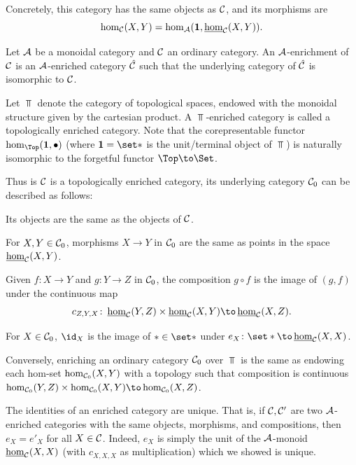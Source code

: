     Concretely, this category has the same objects as ${{\cal C}}$, and its morphisms are
    $$ \hom_{{\cal C}}(X,Y) = \hom_{{\cal A}}({\bf1},\mathop{\underline{\hom}}\nolimits_{{\cal C}}(X,Y)) . $$

\edefn

\bnote

    Let ${{\cal A}}$ be a monoidal category and ${{\cal C}}$ an ordinary category.
    An {\emphcolor ${{\cal A}}$-enrichment} of ${{\cal C}}$ is an ${{\cal A}}$-enriched category $\hat{{{\cal C}}}$ such that the underlying category of $\hat{{{\cal C}}}$ is isomorphic to
    ${{\cal C}}$.

\enote

\bexam

    Let $\Top$ denote the category of topological spaces, endowed with the monoidal structure given by the cartesian product.
    A $\Top$-enriched category is called a {\emphcolor topologically enriched category}.
    Note that the corepresentable functor $\hom_\Top(\1,\bul)$ (where $\1=\set*$ is the unit/terminal object of $\Top$) is naturally isomorphic
    to the forgetful functor $\Top\to\Set$.

    Thus is ${{\cal C}}$ is a topologically enriched category, its underlying category ${{\cal C}}_0$ can be described as follows:
    \benum
        \item Its objects are the same as the objects of ${{\cal C}}$.
        \item For $X,Y\in{{\cal C}}_0$, morphisms $X\to Y$ in ${{\cal C}}_0$ are the same as points in the space $\mathop{\underline{\hom}}\nolimits_{{\cal C}}(X,Y)$.
        \item Given $f\colon X\to Y$ and $g\colon Y\to Z$ in ${{\cal C}}_0$, the composition $g\circ f$ is the image of $(g,f)$ under the continuous map
        $$ c_{Z,Y,X}\colon\ehom_\C(Y,Z)\times\ehom_\C(X,Y) \to \ehom_\C(X,Z) . $$
        \item For $X\in{{\cal C}}_0$, $\id_X$ is the image of $*\in\set*$ under $e_X\colon\set*\to\ehom_\C(X,X)$.
    \eenum

    Conversely, enriching an ordinary category ${{\cal C}}_0$ over $\Top$ is the same as endowing each hom-set $\hom_{{{\cal C}}_0}(X,Y)$ with a topology such that
    composition is continuous $\hom_{\C_0}(Y,Z)\times\hom_{\C_0}(X,Y)\to\hom_{\C_0}(X,Z)$.

\eexam

\bnote

    The identities of an enriched category are unique.
    That is, if ${{\cal C}},{{\cal C}}'$ are two ${{\cal A}}$-enriched categories with the same objects, morphisms, and compositions, then $e_X=e'_X$ for all $X\in{{\cal C}}$.
    Indeed, $e_X$ is simply the unit of the ${{\cal A}}$-monoid $\mathop{\underline{\hom}}\nolimits_{{\cal C}}(X,X)$ (with $c_{X,X,X}$ as multiplication) which we showed is unique.

